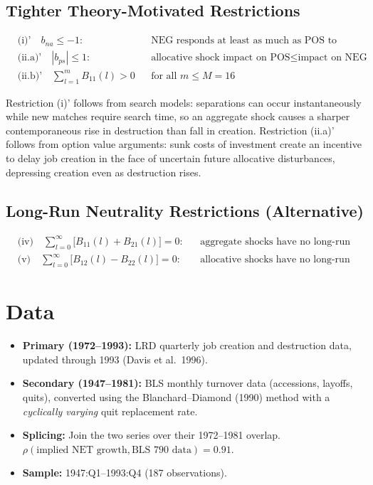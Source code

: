 \subsection*{Tighter Theory-Motivated Restrictions}

\begin{align}
  &\text{(i)'}\quad b_{na} \leq -1:
    &&\text{NEG responds at least as much as POS to aggregate shocks}\\
  &\text{(ii.a)'}\quad |b_{ps}| \leq 1:
    &&\text{allocative shock impact on POS}\leq\text{impact on NEG}\\
  &\text{(ii.b)'}\quad \textstyle\sum_{l=1}^{m} B_{11}(l) > 0
    &&\text{for all } m \leq M\!=\!16
\end{align}

Restriction (i)' follows from search models: separations can occur
instantaneously while new matches require search time, so an aggregate shock
causes a sharper contemporaneous rise in destruction than fall in creation.
Restriction (ii.a)' follows from option value arguments: sunk costs of
investment create an incentive to delay job creation in the face of uncertain
future allocative disturbances, depressing creation even as destruction rises.

\subsection*{Long-Run Neutrality Restrictions (Alternative)}

\begin{align}
  &\text{(iv)}\quad \sum_{l=0}^{\infty}\bigl[B_{11}(l) + B_{21}(l)\bigr] = 0:
    &&\text{aggregate shocks have no long-run effect on job reallocation}\\
  &\text{(v)}\quad \sum_{l=0}^{\infty}\bigl[B_{12}(l) - B_{22}(l)\bigr] = 0:
    &&\text{allocative shocks have no long-run effect on employment}
\end{align}

\section{Data}

\begin{itemize}
  \item \textbf{Primary (1972--1993):} LRD quarterly job creation and
    destruction data, updated through 1993 (Davis et al.\ 1996).
  \item \textbf{Secondary (1947--1981):} BLS monthly turnover data (accessions,
    layoffs, quits), converted using the Blanchard--Diamond (1990) method with
    a \emph{cyclically varying} quit replacement rate.
  \item \textbf{Splicing:} Join the two series over their 1972--1981 overlap.
    $\rho(\text{implied NET growth},\text{BLS 790 data})=0.91$.
  \item \textbf{Sample:} 1947:Q1--1993:Q4 (187 observations).
\end{itemize}

